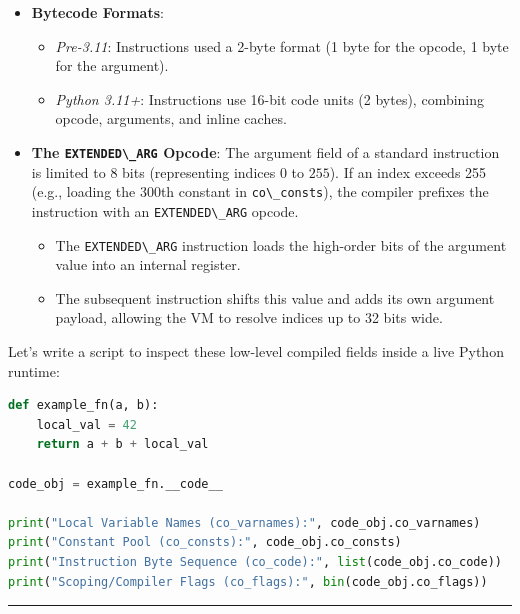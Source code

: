 \begin{itemize}
\tightlist
\item
  \textbf{Bytecode Formats}:

  \begin{itemize}
  \tightlist
  \item
    \emph{Pre-3.11}: Instructions used a 2-byte format (1 byte for the
    opcode, 1 byte for the argument).
  \item
    \emph{Python 3.11+}: Instructions use 16-bit code units (2 bytes),
    combining opcode, arguments, and inline caches.
  \end{itemize}
\item
  \textbf{The \passthrough{\lstinline!EXTENDED\_ARG!} Opcode}: The
  argument field of a standard instruction is limited to 8 bits
  (representing indices \(0\) to \(255\)). If an index exceeds 255
  (e.g., loading the 300th constant in
  \passthrough{\lstinline!co\_consts!}), the compiler prefixes the
  instruction with an \passthrough{\lstinline!EXTENDED\_ARG!} opcode.

  \begin{itemize}
  \tightlist
  \item
    The \passthrough{\lstinline!EXTENDED\_ARG!} instruction loads the
    high-order bits of the argument value into an internal register.
  \item
    The subsequent instruction shifts this value and adds its own
    argument payload, allowing the VM to resolve indices up to 32 bits
    wide.
  \end{itemize}
\end{itemize}

Let's write a script to inspect these low-level compiled fields inside a
live Python runtime:

\begin{lstlisting}[language=Python]
def example_fn(a, b):
    local_val = 42
    return a + b + local_val

code_obj = example_fn.__code__

print("Local Variable Names (co_varnames):", code_obj.co_varnames)
print("Constant Pool (co_consts):", code_obj.co_consts)
print("Instruction Byte Sequence (co_code):", list(code_obj.co_code))
print("Scoping/Compiler Flags (co_flags):", bin(code_obj.co_flags))
\end{lstlisting}

\begin{center}\rule{0.5\linewidth}{0.5pt}\end{center}

